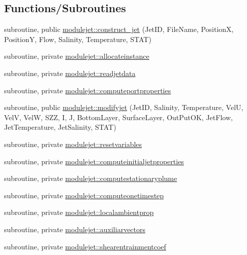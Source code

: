\subsection*{Functions/\+Subroutines}
\begin{DoxyCompactItemize}
\item 
subroutine, public \mbox{\hyperlink{namespacemodulejet_abc7edc1751a89ee8c640aaea045a3d01}{modulejet\+::construct\+\_\+jet}} (Jet\+ID, File\+Name, PositionX, PositionY, Flow, Salinity, Temperature, S\+T\+AT)
\item 
subroutine, private \mbox{\hyperlink{namespacemodulejet_af21d1a641f05197da226314abaeccf5e}{modulejet\+::allocateinstance}}
\item 
subroutine, private \mbox{\hyperlink{namespacemodulejet_ad99b3da948112f106201831bbaaa074f}{modulejet\+::readjetdata}}
\item 
subroutine, private \mbox{\hyperlink{namespacemodulejet_a6a2424bc396ad0eed996ed0d75430e3b}{modulejet\+::computeportproperties}}
\item 
subroutine, public \mbox{\hyperlink{namespacemodulejet_aabae5c457f7fe1dd3d3f540d56e94877}{modulejet\+::modifyjet}} (Jet\+ID, Salinity, Temperature, VelU, VelV, VelW, S\+ZZ, I, J, Bottom\+Layer, Surface\+Layer, Out\+Put\+OK, Jet\+Flow, Jet\+Temperature, Jet\+Salinity, S\+T\+AT)
\item 
subroutine, private \mbox{\hyperlink{namespacemodulejet_ab0790a91803700e0bd5e3ef9db5242c1}{modulejet\+::resetvariables}}
\item 
subroutine, private \mbox{\hyperlink{namespacemodulejet_a8b1ef801e649c2313fee9754d2aeb58a}{modulejet\+::computeinitialjetproperties}}
\item 
subroutine, private \mbox{\hyperlink{namespacemodulejet_aa0e9555f7e9aa809220382ec3e33e9a5}{modulejet\+::computestationaryplume}}
\item 
subroutine, private \mbox{\hyperlink{namespacemodulejet_aa7fe235d6b33c696f614897ed43a1e19}{modulejet\+::computeonetimestep}}
\item 
subroutine, private \mbox{\hyperlink{namespacemodulejet_a1eea8311f846796ccfa34a65730c5c55}{modulejet\+::localambientprop}}
\item 
subroutine, private \mbox{\hyperlink{namespacemodulejet_a188ea99d96436b044d3ea76f4ddfa467}{modulejet\+::auxiliarvectors}}
\item 
subroutine, private \mbox{\hyperlink{namespacemodulejet_afbaba1fae7aab0a9a372600923511fed}{modulejet\+::shearentrainmentcoef}}
\item 

\end{DoxyCompactItemize}
